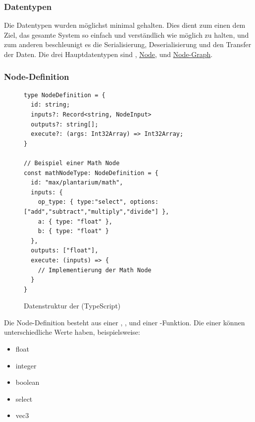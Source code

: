 \documentclass[ngerman]{article}
\begin{document}
\pagebreak

\subsubsection{Datentypen}

Die Datentypen wurden möglichst minimal gehalten. Dies dient zum einen dem Ziel, das gesamte System so einfach und verständlich wie möglich zu halten, und zum
anderen beschleunigt es die Serialisierung, Deserialisierung und den Transfer der Daten.
\br
Die drei Hauptdatentypen sind  , \hyperref[fig:data_node]{Node},  und \hyperref[fig:data_node_graph]{Node-Graph}. 

\subsubsection*{Node-Definition}

\begin{figure}[htbp]
  \begin{code}
    \begin{verbatim}
type NodeDefinition = {
  id: string;
  inputs?: Record<string, NodeInput>
  outputs?: string[];
  execute?: (args: Int32Array) => Int32Array;
}

// Beispiel einer Math Node
const mathNodeType: NodeDefinition = {
  id: "max/plantarium/math",
  inputs: { 
    op_type: { type:"select", options: ["add","subtract","multiply","divide"] }, 
    a: { type: "float" }, 
    b: { type: "float" } 
  },
  outputs: ["float"],
  execute: (inputs) => {
    // Implementierung der Math Node
  }
}
    \end{verbatim}
  \end{code}

  \caption{Datenstruktur der  (TypeScript)}
  \label{sec:data_node_type}

\end{figure}

Die Node-Definition besteht aus einer , ,  und einer -Funktion. Die  einer  können unterschiedliche  Werte haben, beispielsweise:

\begin{itemize}
  \setlength\itemsep{0.0em}
  \item float
  \item integer
  \item boolean
  \item select
  \item vec3
\end{itemize}
\end{document}
